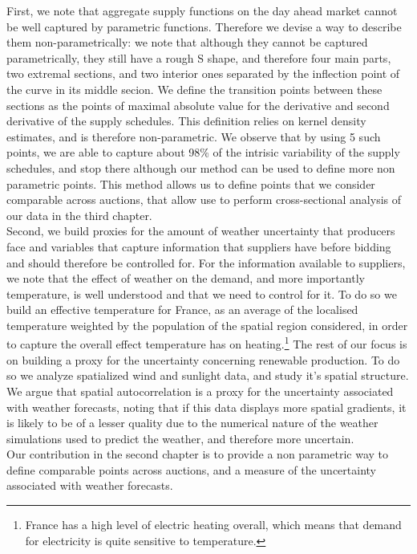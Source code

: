 First, we note that aggregate supply functions on the day ahead market cannot be well captured by parametric functions. Therefore we devise a way to describe them non-parametrically: we note that although they cannot be captured parametrically, they still have a rough S shape, and therefore four main parts, two extremal sections, and two interior ones separated by the inflection point of the curve in its middle secion. We define the transition points between these sections as the points of maximal absolute value for the derivative and second derivative of the supply schedules. This definition relies on kernel density estimates, and is therefore non-parametric. We observe that by using 5 such points, we are able to capture about 98\% of the intrisic variability of the supply schedules, and stop there although our method can be used to define more non parametric points. This method allows us to define points that we consider comparable across auctions, that allow use to perform cross-sectional analysis of our data in the third chapter. \\

Second, we build proxies for the amount of weather uncertainty that producers face and variables that capture information that suppliers have before bidding and should therefore be controlled for. For the information available to suppliers, we note that the effect of weather on the demand, and more importantly temperature, is well understood and that we need to control for it. To do so we build an effective temperature for France, as an average of the localised temperature weighted by the population of the spatial region considered, in order to capture the overall effect temperature has on heating.\footnote{France has a high level of electric heating overall, which means that demand for electricity is quite sensitive to temperature.} The rest of our focus is on building a proxy for the uncertainty concerning renewable production. To do so we analyze spatialized wind and sunlight data, and study it's spatial structure. We argue that spatial autocorrelation is a proxy for the uncertainty associated with weather forecasts, noting that if this data displays more spatial gradients, it is likely to be of a lesser quality due to the numerical nature of the weather simulations used to predict the weather, and therefore more uncertain.\\

Our contribution in the second chapter is to provide a non parametric way to define comparable points across auctions, and a measure of the uncertainty associated with weather forecasts.\\

